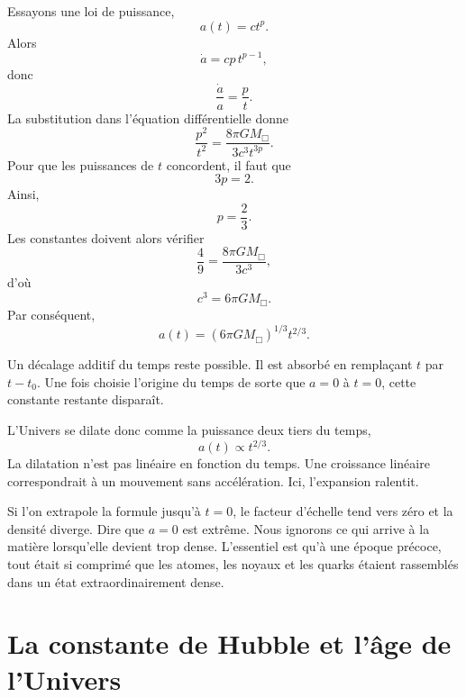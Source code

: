 Essayons une loi de puissance,
\begin{equation}
a(t)=ct^p.
\end{equation}
Alors
\begin{equation}
\dot a = cp\,t^{p-1},
\end{equation}
donc
\begin{equation}
\frac{\dot a}{a}=\frac{p}{t}.
\end{equation}
La substitution dans l’équation différentielle donne
\begin{equation}
\frac{p^2}{t^2}=\frac{8\pi G M_{\Box}}{3c^3t^{3p}}.
\end{equation}
Pour que les puissances de \(t\) concordent, il faut que
\begin{equation}
3p=2.
\end{equation}
Ainsi,
\begin{equation}
p=\frac{2}{3}.
\end{equation}
Les constantes doivent alors vérifier
\begin{equation}
\frac{4}{9}=\frac{8\pi G M_{\Box}}{3c^3},
\end{equation}
d’où
\begin{equation}
c^3=6\pi G M_{\Box}.
\end{equation}
Par conséquent,
\begin{equation}
a(t)=\left(6\pi G M_{\Box}\right)^{1/3}t^{2/3}.
\end{equation}

Un décalage additif du temps reste possible. Il est absorbé en remplaçant \(t\) par \(t-t_0\). Une fois choisie l’origine du temps de sorte que \(a=0\) à \(t=0\), cette constante restante disparaît.

L’Univers se dilate donc comme la puissance deux tiers du temps,
\begin{equation}
a(t)\propto t^{2/3}.
\end{equation}
La dilatation n’est pas linéaire en fonction du temps. Une croissance linéaire correspondrait à un mouvement sans accélération. Ici, l’expansion ralentit.

Si l’on extrapole la formule jusqu’à \(t=0\), le facteur d’échelle tend vers zéro et la densité diverge. Dire que \(a=0\) est extrême. Nous ignorons ce qui arrive à la matière lorsqu’elle devient trop dense. L’essentiel est qu’à une époque précoce, tout était si comprimé que les atomes, les noyaux et les quarks étaient rassemblés dans un état extraordinairement dense.

\section{La constante de Hubble et l’âge de l’Univers}

